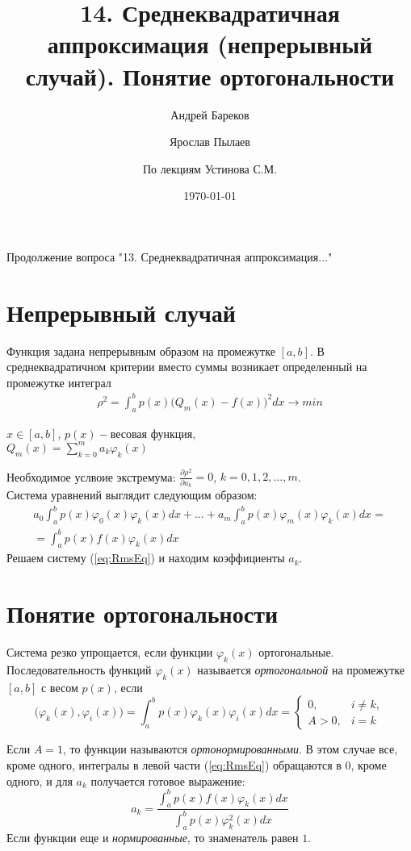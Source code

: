 \documentclass[a4paper,11pt]{article}
\title{14. Среднеквадратичная аппроксимация (непрерывный случай). Понятие ортогональности}
\author{Андрей Бареков \and Ярослав Пылаев \and По лекциям Устинова С.М.}
\date{\today}
\begin{document}
\maketitle
\newpage

Продолжение вопроса "13. Среднеквадратичная аппроксимация..."
\section{Непрерывный случай}
Функция задана непрерывным образом на промежутке $[a,b]$.
В среднеквадратичном критерии вместо суммы возникает определенный на промежутке интеграл
\begin{gather*}
  \rho^2 = \int_a^b p(x)\bigg( Q_m(x)-f(x) \bigg)^2 dx \rightarrow min
\end{gather*}
\begin{flushright}
  \small
  $x\in [a,b]$, $p(x) - \text{весовая функция}$, \\
  $Q_m(x) = \sum_{k=0}^m a_k\varphi_k(x)$
\end{flushright}
Необходимое услвоие экстремума: $\frac{\partial \rho^2}{\partial a_k} = 0$, $k=0,1,2,\dots,m$. \\
Система уравнений выглядит следующим образом: \\
\begin{equation}
  \begin{split}
    a_0\int_a^b p(x)\varphi_0(x)\varphi_k(x)dx +\dots+ a_m\int_a^b p(x)\varphi_m(x)\varphi_k(x)dx = \\
    = \int_a^b p(x)f(x)\varphi_k(x)dx
  \end{split}
  \label{eq:RmsEq}
\end{equation}
Решаем систему (\ref{eq:RmsEq}) и находим коэффициенты $a_k$. \\

\section{Понятие ортогональности}
Система резко упрощается, если функции ${\varphi_k(x)}$ ортогональные.
Последовательность функций ${\varphi_k(x)}$ называется \textit{ортогональной} на промежутке $[a,b]$ с весом $p(x)$, если
\begin{equation}
 \bigg(\varphi_k(x), \varphi_i(x)\bigg) = \int_a^b p(x)\varphi_k(x)\varphi_i(x)dx =
 \begin{cases}
   0, & i \ne k, \\
   A>0, & i=k
 \end{cases}
\end{equation}

Если $A=1$, то функции называются \textit{ортонормированными}. В этом случае все, кроме одного, интегралы в левой части
(\ref{eq:RmsEq}) обращаются в $0$, кроме одного, и для $a_k$ получается готовое выражение:
\begin{equation*}
  a_k = \frac{\int_a^b p(x)f(x)\varphi_k(x)dx}{\int_a^b p(x)\varphi_k^2(x)dx}
\end{equation*}
Если функции еще и \textit{нормированные}, то знаменатель равен $1$.
\end{document}
